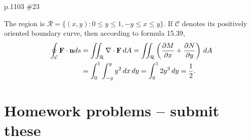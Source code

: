 \begin{practice}p.1103 \#23\end{practice}
\begin{pracsol}
  The region is $\mathcal R=\{(x,y):0\leq y\leq 1,-y\leq x\leq y\}$. If $\mathcal C$ denotes its positively oriented boundary curve, then according to formula 15.39,
  \[\begin{split}
    \oint_{\mathcal C}\mathbf F\cdot\mathbf n ds &= \iint_{\mathcal R}\nabla\cdot\mathbf F\,dA = \iint_{\mathcal R}\left(\frac{\partial M}{\partial x}+\frac{\partial N}{\partial y}\right)\,dA\\
    &= \int_0^1\int_{-y}^y y^2\,dx\,dy=\int_0^1 2y^3\,dy=\frac12.
  \end{split}\]
\end{pracsol}

\newpage

\section{Homework problems -- submit these}

